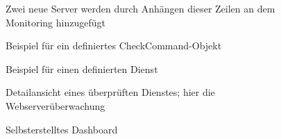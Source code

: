 \begin{figure}[!htb]
\centering
{}
\caption{Zwei neue Server werden durch Anhängen dieser Zeilen an  dem Monitoring hinzugefügt}
\label{screen:newservers}
\end{figure}

\begin{figure}[!htb]
\centering
{}
\caption{Beispiel für ein definiertes \glqq{}CheckCommand\grqq{}-Objekt}
\label{screen:loaddefinition}
\end{figure}

\begin{figure}[!htb]
\centering
{}
\caption{Beispiel für einen definierten Dienst}
\label{screen:service}
\end{figure}

\begin{figure}[!htb]
\centering
{}
\caption{Detailansicht eines überprüften Dienstes; hier die Webserverüberwachung}
\label{screen:webserver}
\end{figure}

\begin{figure}[!htb]
\centering
{}
\caption{Selbsterstelltes Dashboard}
\label{screen:dashboard}
\end{figure}